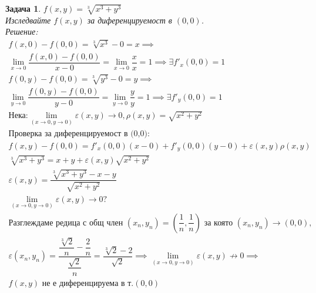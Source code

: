 \documentclass[a4paper,fleqn,12pt]{article}
\newtheorem{task}{Задача}[section]
\begin{document}
\begin{task}
$f(x,y) = \sqrt[3]{x^3 + y^3}$\\
Изследвайте $f(x,y)$ за диференцируемост в $(0,0)$.\\
Решение: 
\begin{gather*}
f(x,0) - f(0,0) = \sqrt[3]{x^3} - 0 = x\implies \\
\lim\limits_{x \to 0} \dfrac{f(x,0) - f(0,0)}{x - 0}= \lim\limits_{x \to 0} \dfrac{x}{x} = 1 \implies \exists f'_x(0,0) = 1\\
f(0,y) - f(0,0) = \sqrt[3]{y^3} - 0 = y \implies \\
\lim\limits_{y \to 0}\dfrac{f(0,y) - f(0,0)}{y - 0} = \lim\limits_{y \to 0} \dfrac{y}{y} = 1 \implies \exists f'_y(0,0) = 1\\
\text{Нека:}
\lim\limits_ {(x \to 0, y \to 0)} \varepsilon (x,y) \to 0, \rho (x,y) = \sqrt{x^2 + y^2}\\
\text{Проверка за диференцируемост в (0,0):}\\
f(x,y) - f(0,0)  = f'_x(0,0)(x - 0) + f'_y(0,0)(y-0) + \varepsilon (x,y) \rho (x,y) \\
\sqrt[3]{x^3 + y^3} = x + y + \varepsilon (x,y) \sqrt{x^2 + y^2} \\
\varepsilon (x,y) = \dfrac{\sqrt[3]{x^3 + y^3} - x - y}{ \sqrt{x^2 + y^2}} \\
\lim\limits_ {(x \to 0, y \to 0)} \varepsilon (x,y) \to 0?\\
\text{Разглеждаме редица с общ член } (x_n, y_n) = \left( \dfrac{1}{n}, \dfrac{1}{n} \right) \text{ за която } (x_n, y_n) \to (0,0), \\
\varepsilon (x_n, y_n) = \dfrac{\dfrac{\sqrt[3]{2}}{n} - \dfrac{2}{n}}{\dfrac{\sqrt{2}}{n}} = \dfrac{\sqrt[3]{2} - 2}{\sqrt{2}} \implies \lim\limits_ {(x \to 0, y \to 0)} \varepsilon (x,y) \not\to 0 \implies \\
 f(x,y) \text{ не е диференцируема в т.} (0,0)
\end{gather*}
\end{task}
\end{document}
